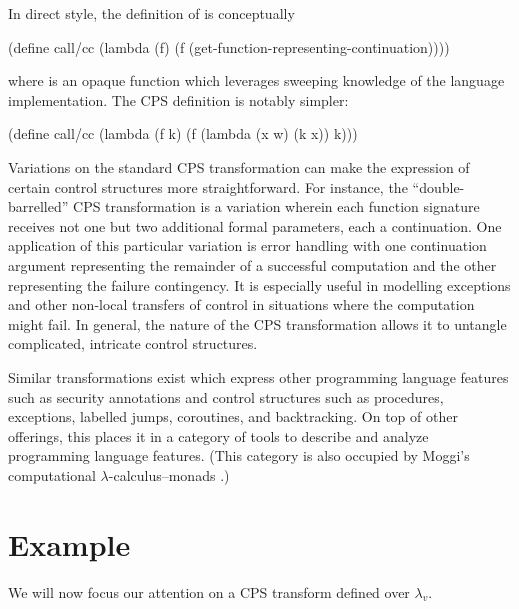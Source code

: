 \documentclass[ms,electronic,twosidetoc,letterpaper,chaptercenter,parttop]{byumsphd}
\newcommand{\lc}{$\lambda$-calculus}
\newcommand{\lv}{$\lambda_v$}
\begin{document}
In direct style, the definition of  is conceptually 
\begin{schemedisplay}
(define call/cc
  (lambda (f)
    (f (get-function-representing-continuation))))
\end{schemedisplay}
where  is an opaque function which leverages
sweeping knowledge of the language implementation. The CPS definition is notably simpler:
\begin{schemedisplay}
(define call/cc
  (lambda (f k)
    (f (lambda (x w) (k x)) k)))
\end{schemedisplay}

Variations on the standard CPS transformation can make the expression of certain control
structures more straightforward. For instance, the ``double-barrelled'' CPS transformation
is a variation wherein each function signature receives not one but two additional formal
parameters, each a continuation. One application of this particular variation is error
handling with one continuation argument representing the remainder of a successful
computation and the other representing the failure contingency. It is especially useful in
modelling exceptions and other non-local transfers of control in situations where the
computation might fail. In general, the nature of the CPS transformation allows it to
untangle complicated, intricate control structures.

Similar transformations exist which express other programming language features such as
security annotations \cite{wallach2000safkasi} and control structures such as procedures,
exceptions, labelled jumps, coroutines, and backtracking. On top of other offerings, this
places it in a category of tools to describe and analyze programming language features.
(This category is also occupied by Moggi's computational \lc--monads
\cite{moggi1989computational}.)

\section{Example}

We will now focus our attention on a CPS transform defined over \lv.
\end{document}
